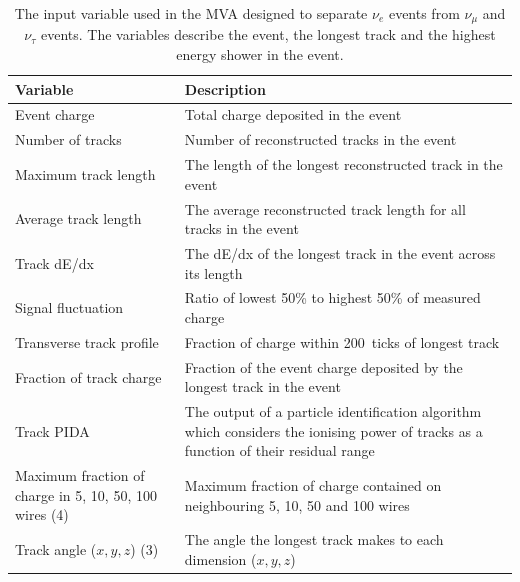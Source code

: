 \begin{table}
  \centering
  \caption[The input variable used in the MVA designed to separate $\nu_e$ events from $\nu_{\mu}$ and $\nu_{\tau}$ events.]{The input variable used in the MVA designed to separate $\nu_e$ events from $\nu_{\mu}$ and $\nu_{\tau}$ events.  The variables describe the event, the longest track and the highest energy shower in the event.}
  \label{tab:FDMVAVariables}
  \begin{tabular}{ p{5cm} p{9cm} }
    \toprule
    Variable & Description \\
    \midrule
                       Event charge                                           & Total charge deposited in the event \\
    \rowcolor{gray!30} Number of tracks                                       & Number of reconstructed tracks in the event \\
                       Maximum track length                                   & The length of the longest reconstructed track in the event \\
    \rowcolor{gray!30} Average track length                                   & The average reconstructed track length for all tracks in the event \\
                       Track dE/dx                                            & The dE/dx of the longest track in the event across its length \\
    \rowcolor{gray!30} Signal fluctuation                                     & Ratio of lowest 50\% to highest 50\% of measured charge \\
                       Transverse track profile                               & Fraction of charge within 200~ticks of longest track \\
    \rowcolor{gray!30} Fraction of track charge                               & Fraction of the event charge deposited by the longest track in the event \\
                       Track PIDA                                             & The output of a particle identification algorithm which considers the ionising power of tracks as a function of their residual range \cite{ArgoNeuT2013} \\
    \rowcolor{gray!30} Maximum fraction of charge in 5, 10, 50, 100 wires (4) & Maximum fraction of charge contained on neighbouring 5, 10, 50 and 100 wires \\
                       Track angle ($x,y,z$) (3)                              & The angle the longest track makes to each dimension ($x,y,z$) \\

\end{tabular}
\end{table}
